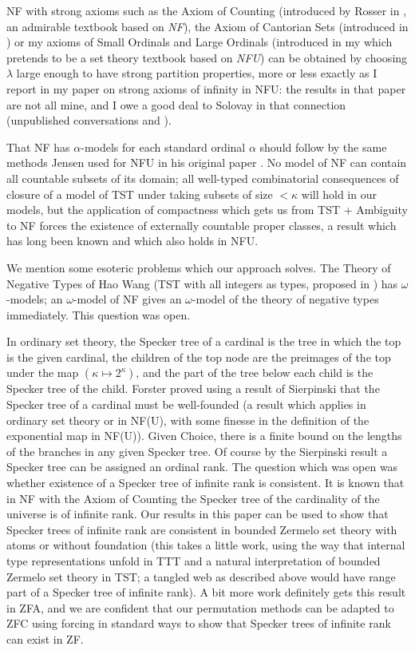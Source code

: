 \documentclass[112pt]{article}
\begin{document}
NF with strong axioms such as the Axiom of Counting (introduced by Rosser in \cite{rosser}, an admirable textbook based on {\em NF\/}), the Axiom of Cantorian Sets (introduced in \cite{henson})  or my axioms of Small Ordinals and Large Ordinals (introduced in  my \cite{mybook} which pretends to be a set theory textbook based on {\em NFU\/}) can be obtained by choosing $\lambda$ large enough to have strong partition properties, more or less exactly as I report in my paper \cite{strongaxioms} on strong axioms of infinity in NFU:  the results in that paper are not all mine, and I owe a good deal to Solovay in that connection (unpublished conversations and \cite{nfub}).

That NF has $\alpha$-models for each standard ordinal $\alpha$ should follow by the same methods Jensen used for NFU in his original paper \cite{nfu}.   No model of NF can contain all countable subsets of its domain;  all well-typed combinatorial consequences
of closure of a model of TST under taking subsets of size $<\kappa$ will hold in our models, but the application of compactness which gets us from TST + Ambiguity to NF forces the existence of externally countable proper classes, a result which has long been known and which also holds in NFU.

We mention some esoteric problems which our approach solves.  The Theory of Negative Types of Hao Wang (TST with all integers as types, proposed in \cite{tnt})  has $\omega$-models;  an $\omega$-model of NF gives an $\omega$-model of the theory of negative types  immediately.  This question was open.

In ordinary set theory, the Specker tree of a cardinal is the tree in which the top is the given cardinal, the children of the top node  are the preimages of the top under the map $(\kappa \mapsto 2^{\kappa})$, and the part of the tree
below each child is the Specker tree of the child.  Forster proved using a result of Sierpinski that the Specker tree of a cardinal must be well-founded (a result which applies in ordinary set theory or in NF(U), with some finesse in the definition of the exponential map in NF(U)).  Given Choice, there is a finite bound on the lengths of the branches in any given Specker tree.  Of course by the Sierpinski result a Specker tree can be assigned an ordinal rank.  The question which was open
was whether existence of a Specker tree of infinite rank is consistent.  It is known that in NF with the Axiom of Counting the Specker tree of the cardinality of the universe is of infinite rank.  Our results in this paper can be used to show that Specker trees of infinite rank are consistent in bounded Zermelo set theory with atoms or without foundation (this takes a little work, using the way that internal type representations unfold in TTT and a natural interpretation of bounded Zermelo set theory in TST;  a tangled web as described above would have range part of a Specker tree of infinite rank).  A bit more work definitely gets this result in ZFA, and we are confident that our permutation methods can be adapted to ZFC using forcing in standard ways to show that Specker trees of infinite rank can exist in ZF.
\end{document}
